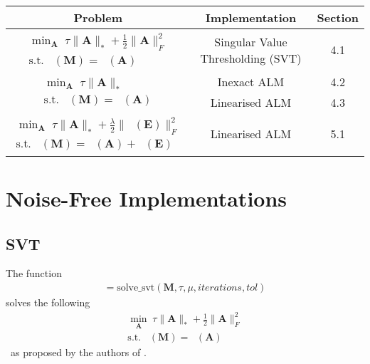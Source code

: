 \documentclass{article}
\DeclareMathOperator*{\pro}{\mathcal P_{\Omega}}
\begin{document}
\begin{table}[!h]
{\small{
\centering

\begin{tabular}{c | c | c}
\hline
Problem & Implementation & Section \\
\hline

$\begin{array}{c} \min_{\mathbf A} \; \tau \| \mathbf A \|_* +  \frac{1}{2} \| \mathbf{ A } \|_F^2 \\
\text{s.t.} \; \pro (\mathbf M) = \pro (\mathbf A) \end{array}$ & Singular Value Thresholding (SVT)	& 4.1  \\
\hline

\multirow{2}{*}{$\begin{array}{c} \min_{\mathbf A} \; \tau \| \mathbf A \|_* \\ \text{s.t.} \; \pro (\mathbf M) = \pro (\mathbf A) \end{array}$} & Inexact ALM 	& 4.2 \\
		& Linearised ALM	& 4.3 \\
\hline
$\begin{array}{c} \min_{\mathbf A} \; \tau \| \mathbf A \|_* + \frac{\lambda}{2} \| \pro (\mathbf E) \|_F^2 \\
\text{s.t.} \; \pro (\mathbf M) = \pro (\mathbf A) + \pro (\mathbf E)\end{array}$ & Linearised ALM & 5.1 \\
		
\end{tabular}
}}
\end{table}

\newpage
\section{Noise-Free Implementations}

\subsection{SVT}

The function
\begin{align}
[ \mathbf A, \mathbf{f\_values}, \mathbf{stop\_vals} ] = \text{solve\_svt}( \mathbf M, \tau, \mu, iterations, tol )
\end{align}
solves the following
\begin{align}
\min_{\mathbf A} \; \tau \| \mathbf A \|_* +  \frac{1}{2} \| \mathbf{ A } \|_F^2 \\
\text{s.t.} \; \pro (\mathbf M) = \pro (\mathbf A) \nonumber 
\end{align}\
as proposed by the authors of \cite{cai2010singular}.
\end{document}

